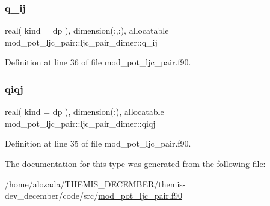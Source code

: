 \subsubsection{\texorpdfstring{q\+\_\+ij}{q\_ij}}
{\footnotesize\ttfamily real( kind = dp ), dimension(\+:,\+:), allocatable mod\+\_\+pot\+\_\+ljc\+\_\+pair\+::ljc\+\_\+pair\+\_\+dimer\+::q\+\_\+ij}



Definition at line 36 of file mod\+\_\+pot\+\_\+ljc\+\_\+pair.\+f90.

\mbox{\label{structmod__pot__ljc__pair_1_1ljc__pair__dimer_ab342f6ea50b777dd052fe2e8dceffc84}} 
\subsubsection{\texorpdfstring{qiqj}{qiqj}}
{\footnotesize\ttfamily real( kind = dp ), dimension(\+:), allocatable mod\+\_\+pot\+\_\+ljc\+\_\+pair\+::ljc\+\_\+pair\+\_\+dimer\+::qiqj}



Definition at line 35 of file mod\+\_\+pot\+\_\+ljc\+\_\+pair.\+f90.



The documentation for this type was generated from the following file\+:\begin{DoxyCompactItemize}
\item 
/home/alozada/\+T\+H\+E\+M\+I\+S\+\_\+\+D\+E\+C\+E\+M\+B\+E\+R/themis-\/dev\+\_\+december/code/src/\hyperlink{mod__pot__ljc__pair_8f90}{mod\+\_\+pot\+\_\+ljc\+\_\+pair.\+f90}\end{DoxyCompactItemize}
